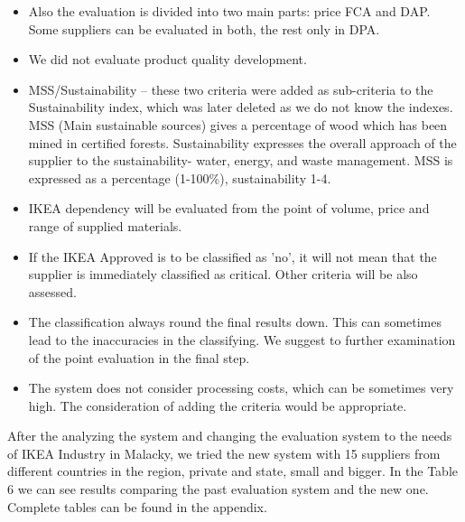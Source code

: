 \documentclass[oneside,12pt]{article}%
\begin{document}
\begin{itemize}
    \item Also the evaluation is divided into two main parts: price FCA and DAP. Some suppliers can be evaluated in both, the rest only in DPA.
    \item We did not evaluate product quality development.
    \item MSS/Sustainability – these two criteria were added as sub-criteria to the Sustainability index, which was later deleted as we do not know the indexes. MSS (Main sustainable sources) gives a percentage of wood which has been mined in certified forests. Sustainability expresses the overall approach of the supplier to the sustainability- water, energy, and waste management. MSS is expressed as a percentage (1-100\%), sustainability 1-4.
  \item IKEA dependency will be evaluated from the point of volume, price and range of supplied materials.
  \item If the IKEA Approved is to be classified as 'no', it will not mean that the supplier is immediately classified as critical. Other criteria will be also assessed.
  \item The classification always round the final results down. This can sometimes lead to the inaccuracies in the classifying. We suggest to further examination of the point evaluation in the final step.
  \item The system does not consider processing costs, which can be sometimes very high. The consideration of adding the criteria would be appropriate.

\end{itemize}


After the analyzing the system and changing the evaluation system to the needs of IKEA Industry in Malacky, we tried the new system with 15 suppliers from different countries in the region, private and state, small and bigger. In the Table 6 we can see results comparing the past evaluation system and the new one. Complete tables can be found in the appendix. \par
\end{document}
